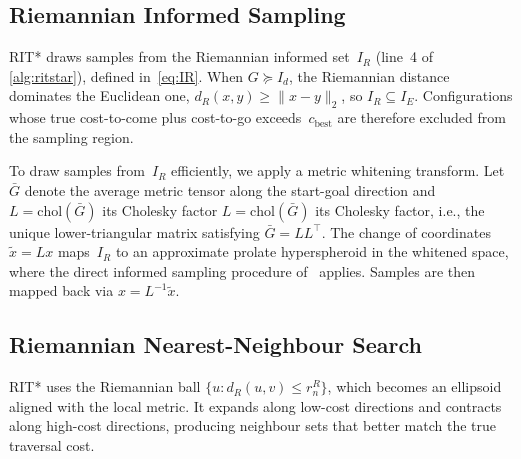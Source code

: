 \documentclass[journal]{IEEEtran}
\newcommand{\IR}{I_{\!R}}
\newcommand{\IE}{I_{\!E}}
\newcommand{\dR}{d_{\!R}}
\newcommand{\Vol}{\mathrm{Vol}}
\begin{document}


\subsection{Riemannian Informed Sampling}\label{sec:whitening}


RIT* draws samples from the Riemannian informed set~$\IR$
(line~4 of \cref{alg:ritstar}), defined in~\eqref{eq:IR}.
When $G \succeq I_d$, the Riemannian distance dominates the
Euclidean one, $\dR(x,y) \ge \|x-y\|_2$, so
$\IR \subseteq \IE$. Configurations whose true
cost-to-come plus cost-to-go exceeds~$c_{\mathrm{best}}$
are therefore excluded from the sampling region.

To draw samples from~$\IR$ efficiently, we apply a metric
whitening transform. Let $\bar{G}$ denote the average metric
tensor along the start-goal direction and
$L = \mathrm{chol}(\bar{G})$ its Cholesky factor $L = \mathrm{chol}(\bar{G})$ its Cholesky factor, i.e., the
unique lower-triangular matrix satisfying $\bar{G} = LL^\top$. The change
of coordinates $\tilde{x} = Lx$ maps~$\IR$ to an
approximate prolate hyperspheroid in the whitened space,
where the direct informed sampling procedure
of~\cite{Gammell2018} applies. Samples are then mapped back
via $x = L^{-1}\tilde{x}$.

\subsection{Riemannian Nearest-Neighbour Search}\label{sec:nn}

RIT* uses the Riemannian ball
$\{u : \dR(u,v) \le r_n^R\}$, which becomes an ellipsoid aligned with
the local metric. It expands along low-cost directions and contracts
along high-cost directions, producing neighbour sets that better match
the true traversal cost.
\end{document}

